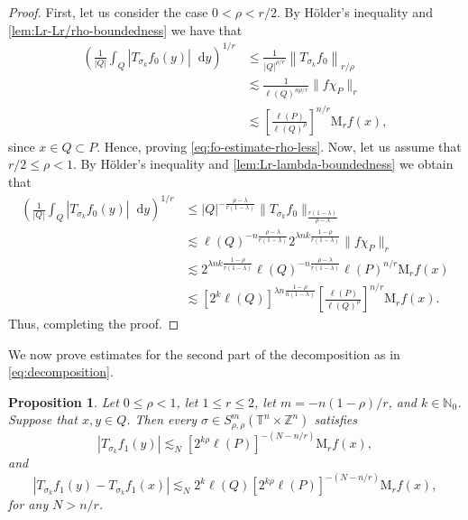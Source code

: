 \documentclass[12pt, reqno]{amsart}
\newtheorem{proposition}[theorem]{Proposition}
\theoremstyle{definition}
\theoremstyle{remark}
\numberwithin{equation}{section}
\newcommand*\diff{\mathop{}\!\mathrm{d}}
\begin{document}
\begin{proof}
    First, let us consider the case $0<\rho<r/2$. By H\"older's inequality and \cref{lem:Lr-Lr/rho-boundedness} we have that 
    \begin{align*}
        \left(
        \frac{1}{|Q|} \int_Q |T_{\sigma_k}f_0(y)|\diff y
        \right)^{1/r} &\leq \frac{1}{|Q|^{\rho/r}} \left\| T_{\sigma_k}f_0  \right\|_{r/\rho} \\
        & \lesssim \frac{1}{\ell(Q)^{n\rho/r}} \|f \chi_P \|_r \\
        & \lesssim \left[ \frac{\ell(P)}{\ell(Q)^\rho} 
            \right]^{n/r} \mathrm{M}_rf(x),
    \end{align*}
    since $x \in Q \subset P$. Hence, proving \cref{eq:fo-estimate-rho-less}. Now, let us assume that $r/2\leq \rho<1$. By H\"older's inequality and \cref{lem:Lr-lambda-boundedness} we obtain that 
    \begin{align*}
        \left(
        \frac{1}{|Q|} \int_Q |T_{\sigma_k}f_0(y)|\diff y
        \right)^{1/r} &\leq {|Q|^{-\frac{\rho-\lambda}{r(1-\lambda)}}} \|T_{\sigma_k}f_0\|_\frac{r(1-\lambda)}{\rho-\lambda} \\
        &\lesssim {\ell(Q)^{-n\frac{\rho-\lambda}{r(1-\lambda)}}} 2^{\lambda nk\frac{1-\rho}{r(1-\lambda)}} \|f\chi_P\|_r  \\
        & \lesssim 2^{\lambda nk\frac{1-\rho}{r(1-\lambda)}}\ell(Q)^{-n\frac{\rho-\lambda}{r(1-\lambda)}} \ell(P)^{n/r} \mathrm{M}_rf(x)\\
        &\lesssim[2^k\ell(Q)]^{\lambda n\frac{1-\rho}{n(1-\lambda)}} 
        \left[ \frac{\ell(P)}{\ell(Q)^\rho}
        \right]^{n/r} \mathrm{M}_rf(x).
    \end{align*}
    Thus, completing the proof.
\end{proof}
We now prove estimates for the second part of the decomposition as in \cref{eq:decomposition}.
\begin{proposition}
    Let $0\leq \rho<1$, let $1\leq r\leq2$, let $m=-n(1-\rho)/r$, and $k\in\mathbb{N}_0$. Suppose that $x, y \in Q$. Then every $\sigma \in S^m_{\rho,\rho}(\mathbb{T}^n \times \mathbb{Z}^n) $ satisfies
    \begin{equation}
        |T_{\sigma_k}f_1(y)| \lesssim_N [2^{k\rho}\ell(P)]^{-(N-n/r)} \mathrm{M}_rf(x),
        \label{eq:f1-estimate}
    \end{equation}
    and
    \begin{equation}
        |T_{\sigma_k}f_1(y) - T_{\sigma_k}f_1(x)| \lesssim_N 2^k\ell(Q) [2^{k\rho}\ell(P)]^{-(N-n/r)} \mathrm{M}_rf(x),
        \label{eq:diff-f1}
    \end{equation}
    for any $N>n/r$.
\end{proposition}
\end{document}
